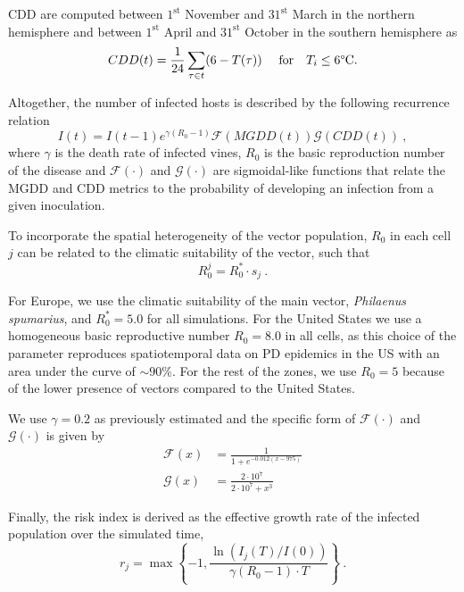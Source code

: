 CDD are computed between $1^{\mathrm{st}}$ November and $31^{\mathrm{st}}$
March in the northern hemisphere and between $1^{\mathrm{st}}$ April and
$31^{\mathrm{st}}$ October in the southern hemisphere as
\begin{equation*}
    CDD(t)= \frac{1}{24}\sum_{\tau \in t} (6-T(\tau)) \ \quad \textrm{for}
    \quad T_i\le 6\textrm{\textdegree C} .
\end{equation*}

Altogether, the number of infected hosts is described by the following
recurrence relation
\begin{equation*}
    I(t)=I(t-1)e^{\gamma(R_0-1)}\mathcal{F}(MGDD(t))\mathcal{G}(CDD(t)) \ ,
\end{equation*}
where $\gamma$ is the death rate of infected vines, $R_0$ is the basic
reproduction number of the disease and $\mathcal{F}(\cdot)$ and
$\mathcal{G}(\cdot)$ are sigmoidal-like functions that relate the MGDD and CDD
metrics to the probability of developing an infection from a given inoculation.

To incorporate the spatial heterogeneity of the vector population, $R_0$ in
each cell $j$ can be related to the climatic suitability of the vector, such
that
\begin{equation*}
    R_0^j=R_0^*\cdot s_j \ .
\end{equation*}

For Europe, we use the climatic suitability of the main vector,
\textit{Philaenus spumarius}, and $R_0^*=5.0$ for all simulations. For the
United States we use a homogeneous basic reproductive number $R_0=8.0$ in all
cells, as this choice of the parameter reproduces spatiotemporal data on PD
epidemics in the US with an area under the curve of $\sim 90\%$. For the rest
of the zones, we use $R_0=5$ because of the lower presence of vectors compared
to the United States.

We use $\gamma=0.2$ as previously estimated \cite{Almeida2003} and the
specific form of $\mathcal{F}(\cdot)$ and $\mathcal{G}(\cdot)$ is given by
\begin{align}
    \mathcal{F}(x) & = \frac{1}{1+e^{-0.012(x-975)}}        \\
    \mathcal{G}(x) & = \frac{2\cdot10^7}{2\cdot 10^7 + x^3}
\end{align}

Finally, the risk index is derived as the effective growth rate of the
infected population over the simulated time,
\begin{equation}
    r_j=\max\left\{-1, \frac{\ln(I_j(T) / I(0))}{\gamma(R_0-1)\cdot
        T}\right\} \ .
\end{equation}

